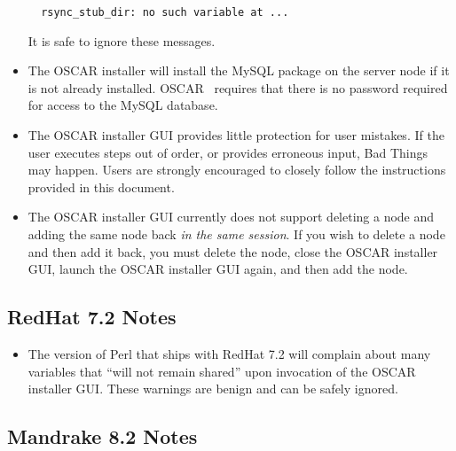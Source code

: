 \begin{itemize}
\begin{verbatim}
  rsync_stub_dir: no such variable at ...
\end{verbatim}

  It is safe to ignore these messages.
  
\item The OSCAR installer will install the MySQL package on the server
  node if it is not already installed.  OSCAR \oscarversion\ requires
  that there is no password required for  access to the
  MySQL database.
  
\item The OSCAR installer GUI provides little protection for user
  mistakes.  If the user executes steps out of order, or provides
  erroneous input, Bad Things may happen.  Users are strongly
  encouraged to closely follow the instructions provided in this
  document.

\item The OSCAR installer GUI currently does not support deleting a
  node and adding the same node back {\em in the same session}.  If
  you wish to delete a node and then add it back, you must delete the
  node, close the OSCAR installer GUI, launch the OSCAR installer GUI
  again, and then add the node.

\end{itemize}


\subsection{RedHat 7.2 Notes}
\label{subsec:rh72notes}

\begin{itemize}
\item The version of Perl that ships with RedHat 7.2 will complain
  about many variables that ``will not remain shared'' upon invocation
  of the OSCAR installer GUI.  These warnings are benign and can be
  safely ignored.
\end{itemize}


\subsection{Mandrake 8.2 Notes}
\label{subsec:mdk82notes}

